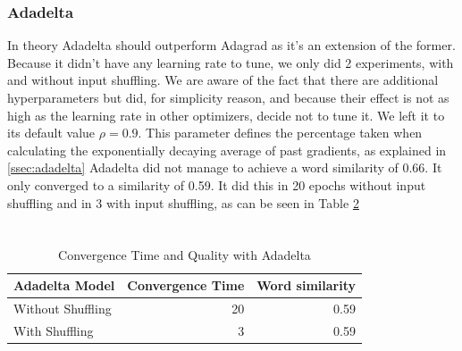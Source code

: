 \subsubsection{Adadelta}
In theory Adadelta \cite{adadelta} should outperform Adagrad as it's an extension of the former. Because it didn't have any learning rate to tune, we only did 2 experiments, with and without input shuffling. We are aware of the fact that there are additional hyperparameters but did, for simplicity reason, and because their effect is not as high as the learning rate in other optimizers, decide not to tune it. We left it to its default value $\rho = 0.9$. This parameter defines the percentage taken when calculating the exponentially decaying average of past gradients, as explained in \ref{ssec:adadelta} Adadelta did not manage to achieve a word similarity of 0.66. It only converged to a similarity of 0.59. It did this in 20 epochs without input shuffling and in 3 with input shuffling, as can be seen in Table \ref{table:results_adadelta}
\begin{table}[h]
\centering
\begin{tabular}{|l|l|l|}
\hline

\end{tabular}
\caption{}
\label{}
\end{table}

\begin{table}[tb]
    \caption{Convergence Time and Quality with Adadelta}
    \begin{tabular}{l r r }%
        \toprule
Adadelta Model & Convergence Time & Word similarity \\ 
        \midrule%
        Without Shuffling & 20 & 0.59 \\ 
With Shuffling & 3 & 0.59 \\
        \midrule%
   \end{tabular}%
   \label{table:results_adadelta}%
\end{table}

